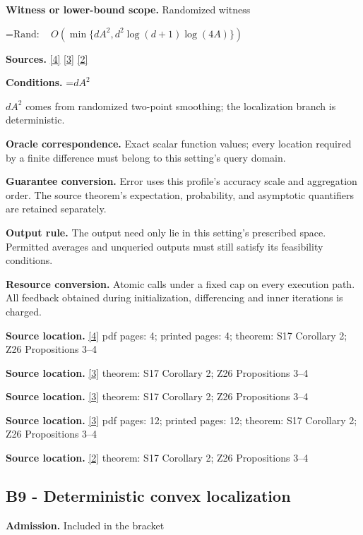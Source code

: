 \documentclass[10pt,a4paper]{article}
\newcommand{\AtlasMath}[1]{\par\begingroup\centering\setbox0=\hbox{$\displaystyle #1$}\ifdim\wd0>1.4\linewidth\typeout{ATLAS WIDE FORMULA: \the\wd0}\fi\ifdim\wd0>\linewidth\resizebox{\linewidth}{!}{\box0}\else\box0\fi\par\endgroup}
\newcommand{\AtlasInlineMath}[1]{\begingroup\setbox0=\hbox{$#1$}\ifdim\wd0>.4\linewidth\endgroup\AtlasMath{#1}\else\endgroup$#1$\fi}
\begin{document}
\textbf{Witness or lower-bound scope.} Randomized witness

\AtlasMath{\mathrm{Rand}:\quad O\!\left(\min\{dA^2,d^2\log(d+1)\log(4A)\}\right)}
\textbf{Sources.} \href{https://jmlr.org/papers/volume18/16-632/16-632.pdf}{[4]} \href{https://arxiv.org/html/2607.16558v2}{[3]} \href{https://www.mathnet.ru/php/archive.phtml?jrnid=mzm&option_lang=eng&paperid=1697&wshow=paper}{[2]}

\textbf{Conditions.} \AtlasInlineMath{dA^2} comes from randomized two-point smoothing; the localization branch is deterministic.

\textbf{Oracle correspondence.} Exact scalar function values; every location required by a finite difference must belong to this setting's query domain.

\textbf{Guarantee conversion.} Error uses this profile's accuracy scale and aggregation order. The source theorem's expectation, probability, and asymptotic quantifiers are retained separately.

\textbf{Output rule.} The output need only lie in this setting's prescribed space. Permitted averages and unqueried outputs must still satisfy its feasibility conditions.

\textbf{Resource conversion.} Atomic calls under a fixed cap on every execution path. All feedback obtained during initialization, differencing and inner iterations is charged.

\textbf{Source location.} \href{https://jmlr.org/papers/volume18/16-632/16-632.pdf}{[4]} pdf pages: 4; printed pages: 4; theorem: S17 Corollary 2; Z26 Propositions 3--4

\textbf{Source location.} \href{https://arxiv.org/html/2607.16558v2}{[3]} theorem: S17 Corollary 2; Z26 Propositions 3--4

\textbf{Source location.} \href{https://arxiv.org/html/2607.16558v2}{[3]} theorem: S17 Corollary 2; Z26 Propositions 3--4

\textbf{Source location.} \href{https://arxiv.org/html/2607.16558v2}{[3]} pdf pages: 12; printed pages: 12; theorem: S17 Corollary 2; Z26 Propositions 3--4

\textbf{Source location.} \href{https://www.mathnet.ru/php/archive.phtml?jrnid=mzm&option_lang=eng&paperid=1697&wshow=paper}{[2]} theorem: S17 Corollary 2; Z26 Propositions 3--4

\subsection{B9 - Deterministic convex localization}
\textbf{Admission.} Included in the bracket
\end{document}
